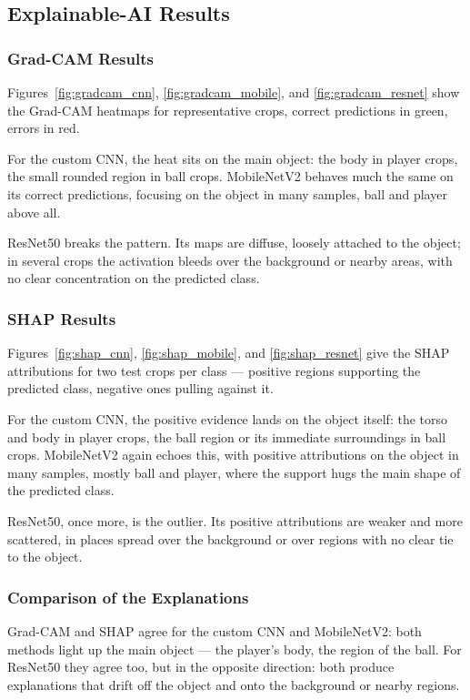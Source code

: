 \documentclass[preprint,12pt]{elsarticle}
\begin{document}
\subsection{Explainable-AI Results}

\subsubsection{Grad-CAM Results}

Figures~\ref{fig:gradcam_cnn}, \ref{fig:gradcam_mobile}, and \ref{fig:gradcam_resnet} show the Grad-CAM heatmaps for representative crops, correct predictions in green, errors in red.

For the custom CNN, the heat sits on the main object: the body in player crops, the small rounded region in ball crops. MobileNetV2 behaves much the same on its correct predictions, focusing on the object in many samples, ball and player above all.

ResNet50 breaks the pattern. Its maps are diffuse, loosely attached to the object; in several crops the activation bleeds over the background or nearby areas, with no clear concentration on the predicted class.

\subsubsection{SHAP Results}

Figures~\ref{fig:shap_cnn}, \ref{fig:shap_mobile}, and \ref{fig:shap_resnet} give the SHAP attributions for two test crops per class --- positive regions supporting the predicted class, negative ones pulling against it.

For the custom CNN, the positive evidence lands on the object itself: the torso and body in player crops, the ball region or its immediate surroundings in ball crops. MobileNetV2 again echoes this, with positive attributions on the object in many samples, mostly ball and player, where the support hugs the main shape of the predicted class.

ResNet50, once more, is the outlier. Its positive attributions are weaker and more scattered, in places spread over the background or over regions with no clear tie to the object.

\subsubsection{Comparison of the Explanations}

Grad-CAM and SHAP agree for the custom CNN and MobileNetV2: both methods light up the main object --- the player's body, the region of the ball. For ResNet50 they agree too, but in the opposite direction: both produce explanations that drift off the object and onto the background or nearby regions.
\end{document}
